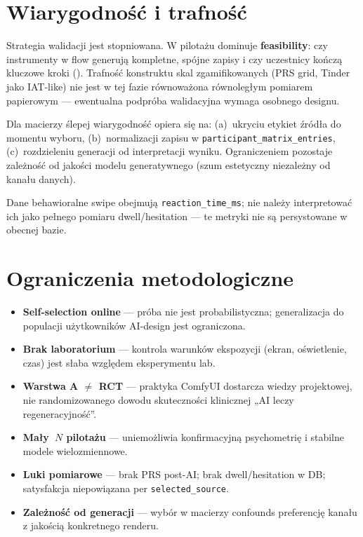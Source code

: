\section{Wiarygodność i trafność}
\label{ch06:sec:trafnosc}

Strategia walidacji jest stopniowana. W pilotażu dominuje \textbf{feasibility}: czy instrumenty w flow generują kompletne, spójne zapisy i czy uczestnicy kończą kluczowe kroki (). Trafność konstruktu skal zgamifikowanych (PRS grid, Tinder jako IAT-like) nie jest w tej fazie równoważona równoległym pomiarem papierowym --- ewentualna podpróba walidacyjna wymaga osobnego designu.

Dla macierzy ślepej wiarygodność opiera się na: (a)~ukryciu etykiet źródła do momentu wyboru, (b)~normalizacji zapisu w \texttt{participant\_matrix\_entries}, (c)~rozdzieleniu generacji od interpretacji wyniku. Ograniczeniem pozostaje zależność od jakości modelu generatywnego (szum estetyczny niezależny od kanału danych).

Dane behawioralne swipe obejmują \texttt{reaction\_time\_ms}; nie należy interpretować ich jako pełnego pomiaru dwell/hesitation --- te metryki nie są persystowane w obecnej bazie.

\section{Ograniczenia metodologiczne}
\label{ch06:sec:ograniczenia}

\begin{itemize}
  \item \textbf{Self-selection online} --- próba nie jest probabilistyczna; generalizacja do populacji użytkowników AI-design jest ograniczona.
  \item \textbf{Brak laboratorium} --- kontrola warunków ekspozycji (ekran, oświetlenie, czas) jest słaba względem eksperymentu lab.
  \item \textbf{Warstwa A $\neq$ RCT} --- praktyka ComfyUI dostarcza wiedzy projektowej, nie randomizowanego dowodu skuteczności klinicznej „AI leczy regeneracyjność”.
  \item \textbf{Mały~$N$ pilotażu} --- uniemożliwia konfirmacyjną psychometrię i stabilne modele wielozmiennowe.
  \item \textbf{Luki pomiarowe} --- brak PRS post-AI; brak dwell/hesitation w DB; satysfakcja niepowiązana per \texttt{selected\_source}.
  \item \textbf{Zależność od generacji} --- wybór w macierzy confounds preferencję kanału z jakością konkretnego renderu.
\end{itemize}

